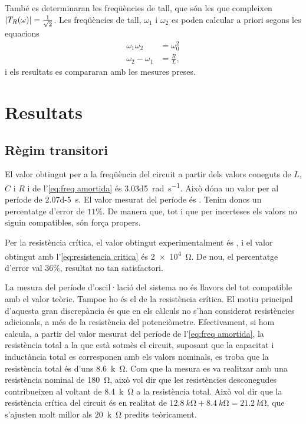 També es determinaran les freqüències de tall, que són les que compleixen \( \left\lvert T_R(\omega) \right\rvert = \frac{1}{\sqrt{2}} \). Les freqüències de tall, \( \omega_1 \) i \( \omega_2 \) es poden calcular a priori segons les equacions
\begin{equation} \label{eq:freqs de tall}
	\begin{aligned}
		\omega_1\omega_2 &= \omega_0^2 \\
		\omega_2 - \omega_1 &= \frac{R}{L},
	\end{aligned}
\end{equation}
i els resultats es compararan amb les mesures preses. 

\section{Resultats}
\subsection{Règim transitori}
El valor obtingut per a la freqüència del circuit a partir dels valors coneguts de \( L \), \( C \) i \( R \) i de l'\cref{eq:freq amortida} és \SI{3.03d5}{rad.s^{-1}}. Això dóna un valor per al període de \SI{2.07d-5}{s}. El valor mesurat del període és . Tenim doncs un percentatge d'error de $11\%$. De manera que, tot i que per incerteses els valors no siguin compatibles, són força propers.

Per la resistència crítica, el valor obtingut experimentalment és , i el valor obtingut amb l'\cref{eq:resistencia critica} és \SI{2e4}{\ohm}. De nou, el percentatge d'error val $36\%$, resultat no tan satisfactori. 

La mesura del període d'oscil·lació del sistema no és llavors del tot compatible amb el valor teòric. Tampoc ho és el de la resistència crítica. El motiu principal d'aquesta gran discrepància és que en els càlculs no s'han considerat resistències adicionals, a més de la resistència del potenciòmetre. Efectivament, si hom calcula, a partir del valor mesurat del període de l'\cref{eq:freq amortida}, la resistència total a la que està sotmès el circuit, suposant que la capacitat i inductància total es corresponen amb els valors nominals, es troba que la resistència total és d'uns \SI{8.6}{k\ohm}. Com que la mesura es va realitzar amb una resistència nominal de \SI{180}{\ohm}, això vol dir que les resistències desconegudes contribueixen al voltant de \SI{8.4}{k\ohm} a la resistència total. Això vol dir que la resistència crítica del circuit és en realitat de \( \SI{12.8}{k\ohm} + \SI{8.4}{k\ohm} = \SI{21.2}{k\ohm} \), que s'ajusten molt millor als \SI{20}{k\ohm} predits teòricament.  

